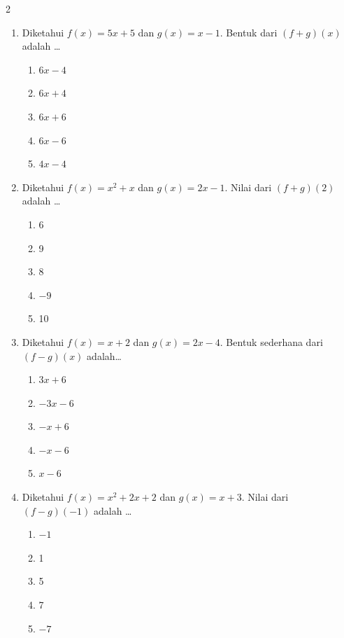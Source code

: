 \documentclass[10pt,a4paper]{article}
\begin{document}
\begin{multicols}{2}
\begin{enumerate}
    \item Diketahui $f(x)=5x+5$ dan $g(x)=x-1$. Bentuk dari $(f+g)(x)$ adalah \dots
    \begin{enumerate}
        \item $6x-4$
        \item $6x+4$
        \item $6x+6$
        \item $6x-6$
        \item $4x-4$
    \end{enumerate}

    \item Diketahui $f(x)=x^2+x$ dan $g(x)=2x-1$. Nilai dari $(f+g)(2)$ adalah \dots
    \begin{enumerate}
        \item 6
        \item 9
        \item 8
        \item $-9$
        \item 10
    \end{enumerate}

    \item Diketahui $f(x)=x+2$ dan $g(x)=2x-4$. Bentuk sederhana dari $(f-g)(x)$ adalah\dots
    \begin{enumerate}
        \item $3x+6$
        \item $-3x-6$
        \item $-x+6$
        \item $-x-6$
        \item $x-6$
    \end{enumerate}

    \item Diketahui $f(x)=x^2+2x+2$ dan $g(x)=x+3$. Nilai dari $(f-g)(-1)$ adalah \dots
    \begin{enumerate}
        \item $-1$
        \item 1
        \item 5
        \item 7
        \item $-7$
    \end{enumerate}


\end{enumerate}
\end{multicols}
\end{document}
